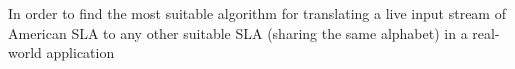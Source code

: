 In order to find the most suitable algorithm for translating a live input stream of American SLA to any other suitable SLA (sharing the same alphabet) in a real-world application
